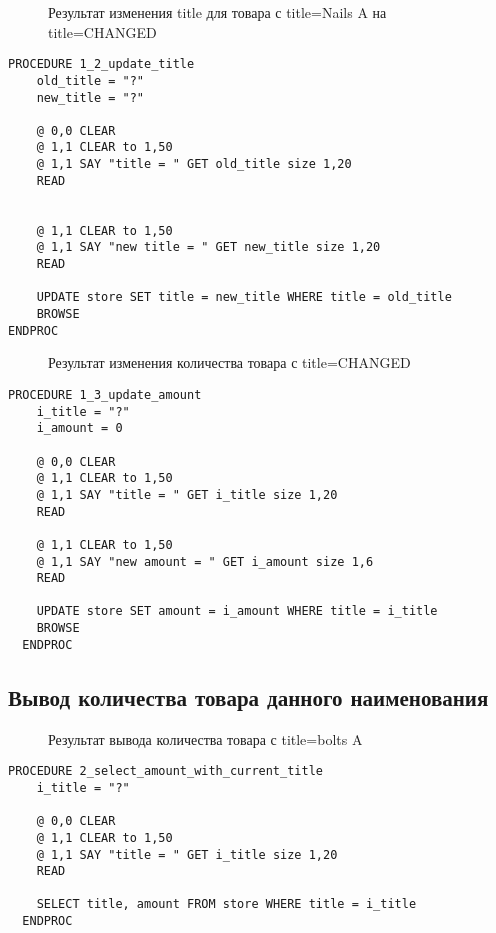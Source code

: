 \begin{figure}[h!t]
  \caption{Результат изменения title для товара с title=Nails A на title=CHANGED}
\end{figure}

\begin{lstlisting}[float,caption=Source code]
PROCEDURE 1_2_update_title
	old_title = "?"
	new_title = "?"

	@ 0,0 CLEAR
	@ 1,1 CLEAR to 1,50
	@ 1,1 SAY "title = " GET old_title size 1,20
	READ
	
	
	@ 1,1 CLEAR to 1,50
	@ 1,1 SAY "new title = " GET new_title size 1,20
	READ
	
	UPDATE store SET title = new_title WHERE title = old_title
	BROWSE
ENDPROC
\end{lstlisting}

\begin{figure}[h!t]
  \caption{Результат изменения количества товара с title=CHANGED}
\end{figure}

\begin{lstlisting}[float,caption=Source code]
  PROCEDURE 1_3_update_amount
	i_title = "?"
	i_amount = 0

	@ 0,0 CLEAR
	@ 1,1 CLEAR to 1,50
	@ 1,1 SAY "title = " GET i_title size 1,20
	READ
	
	@ 1,1 CLEAR to 1,50
	@ 1,1 SAY "new amount = " GET i_amount size 1,6
	READ
	
	UPDATE store SET amount = i_amount WHERE title = i_title
	BROWSE
  ENDPROC
\end{lstlisting}

\subsection{Вывод количества товара данного наименования}

\begin{figure}[h!t]
  \caption{Результат вывода количества товара с title=bolts A}
\end{figure}

\begin{lstlisting}[float,caption=Source code]
  PROCEDURE 2_select_amount_with_current_title
	i_title = "?"

	@ 0,0 CLEAR
	@ 1,1 CLEAR to 1,50
	@ 1,1 SAY "title = " GET i_title size 1,20
	READ
	
	SELECT title, amount FROM store WHERE title = i_title
  ENDPROC
\end{lstlisting}


